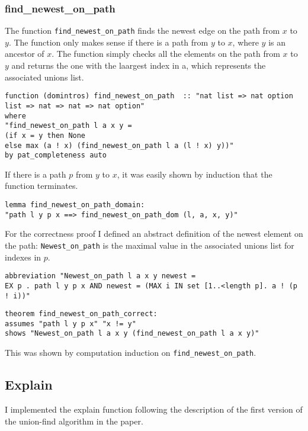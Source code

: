 \subsubsection{find\_newest\_on\_path}

The function \lstinline{find_newest_on_path} finds the newest edge on the path from $x$ to $y$. The function only makes sense if there is a path from $y$ to $x$, where $y$ is an ancestor of $x$. The function simply checks all the elements on the path from $x$ to $y$ and returns the one with the laargest index in a, which represents the associated unions list.

\begin{lstlisting}
function (domintros) find_newest_on_path  :: "nat list => nat option list => nat => nat => nat option"
where
"find_newest_on_path l a x y = 
(if x = y then None
else max (a ! x) (find_newest_on_path l a (l ! x) y))"
by pat_completeness auto
\end{lstlisting}

If there is a path $p$ from $y$ to $x$, it was easily shown by induction that the function terminates.

\begin{lstlisting}
lemma find_newest_on_path_domain:
"path l y p x ==> find_newest_on_path_dom (l, a, x, y)"
\end{lstlisting}

For the correctness proof I defined an abstract definition of the newest element on the path: \lstinline{Newest_on_path} is the maximal value in the associated unions list for indexes in $p$.

\begin{lstlisting}
abbreviation "Newest_on_path l a x y newest =
EX p . path l y p x AND newest = (MAX i IN set [1..<length p]. a ! (p ! i))"
\end{lstlisting}

\begin{lstlisting}
theorem find_newest_on_path_correct:
assumes "path l y p x" "x != y"
shows "Newest_on_path l a x y (find_newest_on_path l a x y)"
\end{lstlisting}

This was shown by computation induction on \lstinline{find_newest_on_path}.

\subsection{Explain}

I implemented the explain function following the description of the first version of the union-find algorithm in the paper\cite{Nieuwenhuis}.

